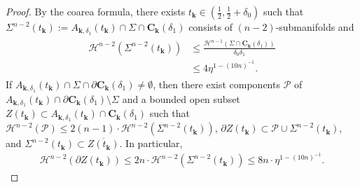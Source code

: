 \documentclass[letter]{amsart}
\theoremstyle{definition}
\theoremstyle{remark}
\begin{document}
\begin{proof}
By the coarea formula, there exists $t_{\mathbf{k}} \in (\frac{1}{2}, \frac{1}{2}+ \delta _0)$ such that $ \Sigma ^{n-2}(t_{\mathbf{k}}):= A_{\mathbf{k}, \delta _1}(t_{\mathbf{k}}) \cap \Sigma \cap \mathbf{C}_{\mathbf{k}}(\delta _1)$ consists of $(n-2)$-submanifolds and 
\begin{align}\label{small length k-n}
\begin{split}
	\mathcal{H}^{n-2}(\Sigma^{n-2}(t_{\mathbf{k}})) &\leq \frac{\mathcal{H}^{n-1}(\Sigma \cap \mathbf{C}_{\mathbf{k}}(\delta _1) )}{\delta _0 \delta _1}\\
											      &\leq 4 \eta ^{1-  (10n)^{-1}}.
\end{split}
\end{align}
If $A_{\mathbf{k}, \delta _1}(t_{\mathbf{k}}) \cap \Sigma \cap \partial \mathbf{C}_{\mathbf{k}}(\delta _1) \neq \emptyset$, then there exist components $ \mathcal{P}$ of $A_{\mathbf{k}, \delta _1}(t_{\mathbf{k}})\cap \partial \mathbf{C}_{\mathbf{k}}(\delta _1) \setminus \Sigma $ and a bounded open subset $Z(t_{\mathbf{k}}) \subset A_{\mathbf{k}, \delta _1}(t_{\mathbf{k}}) \cap \mathbf{C}_{\mathbf{k}}(\delta _1)$ such that $\mathcal{H}^{n-2}(\mathcal{P}) \leq 2(n-1) \cdot \mathcal{H}^{n-2}(\Sigma ^{n-2}(t_{\mathbf{k}}))$, $\partial Z(t_{\mathbf{k}}) \subset \mathcal{P} \cup \Sigma ^{n-2}(t_{\mathbf{k}})$, and $\Sigma ^{n-2}(t_{\mathbf{k}}) \subset \overline{Z(t_{\mathbf{k}})}$. In particular, 
\begin{align}\label{Zk boundary}
	\mathcal{H}^{n-2}(\partial Z(t_{\mathbf{k}}) ) \leq 2n \cdot \mathcal{H}^{n-2}(\Sigma ^{n-2}(t_{\mathbf{k}}) ) \leq 8n\cdot \eta ^{1- (10n)^{-1}}.
\end{align}



\end{proof}
\end{document}
